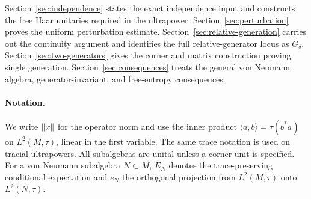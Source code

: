Section~\ref{sec:independence} states the exact independence input and
constructs the free Haar unitaries required in the ultrapower.
Section~\ref{sec:perturbation} proves the uniform perturbation estimate.
Section~\ref{sec:relative-generation} carries out the continuity
argument and identifies the full relative-generator locus as
$G_\delta$. Section~\ref{sec:two-generators} gives the corner and
matrix construction proving single generation.
Section~\ref{sec:consequences} treats the general von Neumann
algebra, generator-invariant, and free-entropy consequences.

\paragraph{Notation.}
We write $\lVert x\rVert$ for the operator norm and use the inner product
$\langle a,b\rangle=\tau(b^*a)$ on $L^2(M,\tau)$, linear in the
first variable. The same trace notation is used on tracial ultrapowers.
All subalgebras are unital unless a corner unit is specified.
For a von Neumann subalgebra $N\subset M$, $E_N$ denotes the
trace-preserving conditional expectation and $e_N$ the orthogonal
projection from $L^2(M,\tau)$ onto $L^2(N,\tau)$.
